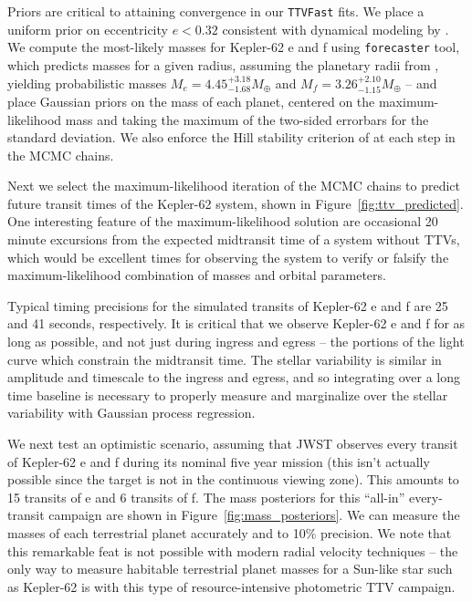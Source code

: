 Priors are critical to attaining convergence in our \texttt{TTVFast} fits. We place a uniform prior on eccentricity $e < 0.32$ consistent with dynamical modeling by \citet{Shields2016}. We compute the most-likely masses for Kepler-62 e and f using \citet{Chen2017} \texttt{forecaster} tool, which predicts masses for a given radius, assuming the planetary radii from \citet{Berger2018}, yielding probabilistic masses $M_e = 4.45^{+3.18}_{-1.68} M_\oplus$ and $M_f = 3.26^{+2.10}_{-1.15} M_\oplus$ -- and place Gaussian priors on the mass of each planet, centered on the maximum-likelihood mass and taking the maximum of the two-sided errorbars for the standard deviation. We also enforce the Hill stability criterion of \citet{Gladman1993} at each step in the MCMC chains. 

Next we select the maximum-likelihood iteration of the MCMC chains to predict future transit times of the Kepler-62 system, shown in Figure~\ref{fig:ttv_predicted}. One interesting feature of the maximum-likelihood solution are occasional 20 minute excursions from the expected midtransit time of a system without TTVs, which would be excellent times for observing the system to verify or falsify the maximum-likelihood combination of masses and orbital parameters. 

Typical timing precisions for the simulated transits of Kepler-62 e and f are 25 and 41 seconds, respectively. It is critical that we observe Kepler-62 e and f for as long as possible, and not just during ingress and egress -- the portions of the light curve which constrain the midtransit time. The stellar variability is similar in amplitude and timescale to the ingress and egress, and so integrating over a long time baseline is necessary to properly measure and marginalize over the stellar variability with Gaussian process regression.

We next test an optimistic scenario, assuming that JWST observes every transit of Kepler-62 e and f during its nominal five year mission (this isn't actually possible since the target is not in the continuous viewing zone). This amounts to 15 transits of e and 6 transits of f. The mass posteriors for this ``all-in'' every-transit campaign are shown in Figure~\ref{fig:mass_posteriors}. We can measure the masses of each terrestrial planet accurately and to 10\% precision. We note that this remarkable feat is not possible with modern radial velocity techniques -- the only way to measure habitable terrestrial planet masses for a Sun-like star such as Kepler-62 is with this type of resource-intensive photometric TTV campaign.

